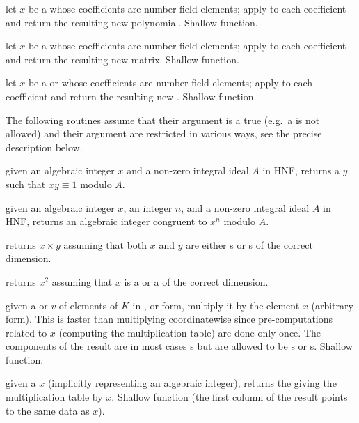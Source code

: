  let $x$ be a  whose coefficients
are number field elements; apply  to each
coefficient and return the resulting new polynomial. Shallow function.

 let $x$ be a  whose coefficients
are number field elements; apply  to each
coefficient and return the resulting new matrix. Shallow function.

 let $x$ be a  or
 whose coefficients
are number field elements; apply  to each
coefficient and return the resulting new . Shallow function.

 The following routines assume that their 
argument is a true  (e.g.~a  is not allowed) and their
argument are restricted in various ways, see the precise description below.

 given an algebraic integer
$x$ and a non-zero integral ideal $A$ in HNF, returns a $y$ such that
$xy \equiv 1$ modulo $A$.

 given an algebraic
integer $x$, an integer $n$, and a non-zero integral ideal $A$ in HNF,
returns an algebraic integer congruent to $x^n$ modulo $A$.

 returns $x\times y$ assuming
that both $x$ and $y$ are either s or s of the correct
dimension.

 returns $x^2$ assuming that $x$ is a 
or a  of the correct dimension.

 given a  or 
$v$ of elements of $K$ in ,  or  form, multiply
it by the element $x$ (arbitrary form). This is faster than multiplying
coordinatewise since pre-computations related to $x$ (computing the
multiplication table) are done only once. The components of the result
are in most cases s but are allowed to be s or s.
Shallow function.

 given a  $x$ (implicitly
representing an algebraic integer), returns the  giving the
multiplication table by $x$. Shallow function (the first column of the result
points to the same data as $x$).

